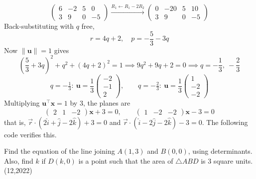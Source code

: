 \begin{equation}
\left(\begin{array}{ccc|c} 6 & -2 & 5 & 0 \\ 3 & 9 & 0 & -5 \end{array}\right) \xrightarrow{R_1 \leftarrow R_1 - 2R_2}
\left(\begin{array}{ccc|c} 0 & -20 & 5 & 10 \\ 3 & 9 & 0 & -5 \end{array}\right)
\end{equation}
Back-substituting with $q$ free,
\begin{equation}
r = 4q + 2, \quad p = -\frac{5}{3} - 3q
\end{equation}
Now $\|\mathbf{u}\| = 1$ gives
\begin{equation}
\left(\frac{5}{3} + 3q\right)^2 + q^2 + (4q+2)^2 = 1 \implies 9q^2 + 9q + 2 = 0 \implies q = -\frac{1}{3},\ -\frac{2}{3}
\end{equation}
\begin{equation}
q = -\tfrac{1}{3}:\ \mathbf{u} = \frac{1}{3}\begin{pmatrix} -2 \\ -1 \\ 2 \end{pmatrix}, \qquad
q = -\tfrac{2}{3}:\ \mathbf{u} = \frac{1}{3}\begin{pmatrix} 1 \\ -2 \\ -2 \end{pmatrix}
\end{equation}
Multiplying $\mathbf{u}^{\top}\mathbf{x} = 1$ by $3$, the planes are
\begin{equation}
\begin{pmatrix} 2 & 1 & -2 \end{pmatrix}\mathbf{x} + 3 = 0, \qquad
\begin{pmatrix} 1 & -2 & -2 \end{pmatrix}\mathbf{x} - 3 = 0
\end{equation}
that is, $\vec{r}\cdot(2\hat{i} + \hat{j} - 2\hat{k}) + 3 = 0$ and $\vec{r}\cdot(\hat{i} - 2\hat{j} - 2\hat{k}) - 3 = 0$. The following code verifies this.

\nopagebreak[4]
\begin{center}
\end{center}


\clearpage
\item Find the equation of the line joining $A(1, 3)$ and $B(0, 0)$, using determinants. Also, find $k$ if $D(k, 0)$ is a point such that the area of $\triangle ABD$ is $3$ square units. \hfill (12,2022)

